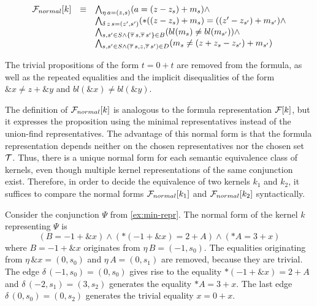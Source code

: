 \[
    \begin{array}{lll}
        \mathcal{F}_{normal}[k] & \equiv & \bigwedge_{\eta\,a=(z,s)} (a = (z - z_s) + m_s) \land                                                                     \\
                       &        & \bigwedge_{\delta\,z\,s=(z',s')} (*((z-z_s) + m_s) = ((z'-z_{s'}) + m_{s'}) \land                                         \\
                       &        & \bigwedge_{s,s' \in S \land \{\overline{\tau}\,s,\overline{\tau}\,s'\}\in B} (bl(m_{s}) \neq bl(m_{s'})) \land           \\
                       &        & \bigwedge_{s,s' \in S \land (\overline{\tau}\,s, z,\overline{\tau}\,s') \in D} (m_{s} \neq (z+ z_{s} -z_{s'}) + m_{s'})
    \end{array}
\]

The trivial propositions of the form $t = 0 + t$ are removed from the formula, as well as the repeated equalities and the implicit disequalities of the form $\&x \neq z + \&y$ and $bl(\&x) \neq bl(\&y)$.

The definition of $\mathcal{F}_{normal}[k]$ is analogous to the formula representation $\mathcal{F}[k]$, but it expresses the proposition using the minimal representatives instead of the union-find representatives.
The advantage of this normal form is that the formula representation depends neither on the chosen representatives nor the chosen set $\mathcal{T}$.
Thus, there is a unique normal form for each semantic equivalence class of kernels, even though multiple kernel representations of the same conjunction exist.
Therefore, in order to decide the equivalence of two kernels $k_1$ and $k_2$, it suffices to compare the normal forms $\mathcal{F}_{normal}[k_1]$ and $\mathcal{F}_{normal}[k_2]$ syntactically.

\begin{example}
    Consider the conjunction $\Psi$ from \cref{ex:min-repr}.
    The normal form of the kernel $k$ representing $\Psi$ is
    \[
        (B = -1+\&x) \land (*(-1 + \&x) = 2 + A) \land (*A = 3 + x)
    \]
    where $B = -1 + \&x$ originates from $\eta\,B = (-1,s_0)$.
    The equalities originating from $\eta\,\&x = (0,s_0)$ and $\eta\,A = (0, s_1)$ are removed, because they are trivial.
    The edge $\delta\,(-1,s_0) = (0,s_0)$ gives rise to the equality $*(-1 + \&x) = 2 + A$ and $\delta\,(-2,s_1) = (3,s_2)$ generates the equality $*A = 3 + x$.
    The last edge $\delta\,(0,s_0) = (0,s_2)$ generates the trivial equality $x = 0 + x$.
\end{example}

